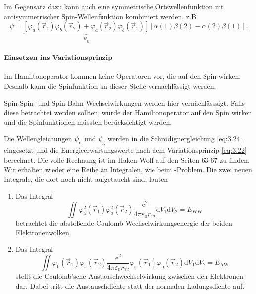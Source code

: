 	Im Gegensatz dazu kann auch eine symmetrische Ortswellenfunktion mt antisymmetrischer Spin-Wellenfunktion kombiniert werden, z.B.
	\setcounter{equation}{34}
	\begin{equation}
		\label{eq:3.35}
		\psi = \underbrace{\left[ \varphi_{a} \left( \vec{r}_{1} \right) \varphi_{b}\left( \vec{r}_{2} \right) + \varphi_{a}\left( \vec{r}_{2} \right) \varphi_{b}\left( \vec{r}_{1} \right)  \right]}_{ \psi_{\text{g}}} \left[ \alpha\left( 1 \right) \beta\left( 2 \right) - \alpha\left( 2 \right) \beta\left( 1 \right)  \right]. 
	\end{equation}
\paragraph{Einsetzen ins Variationsprinzip}
	Im Hamiltonoperator kommen keine Operatoren vor, die auf den Spin wirken. 
	Deshalb kann die Spinfunktion an dieser Stelle vernachlässigt werden.
	\begin{verbal}
		Spin-Spin- und Spin-Bahn-Wechselwirkungen werden hier vernächlässsigt.
		Falls diese betrachtet werden sollten, würde der Hamiltonoperator auf den Spin wirken und die Spinfunktionen müssten berücksichtigt werden.
	\end{verbal}
	Die Wellengleichungen $ \psi_{\text{u}}$ und $ \psi_{\text{g}}$ werden in die Schrödignergleichung \eqref{eq:3.24} eingesetzt und die Energieerwartungswerte nach dem Variationsprinzip \eqref{eq:3.22} berechnet.
	Die volle Rechnung ist im Haken-Wolf auf den Seiten 63-67 zu finden.\\

	Wir erhalten wieder eine Reihe an Integralen, wie beim -Problem. 
	Die zwei neuen Integrale, die dort noch nicht aufgetaucht sind, lauten
	\begin{enumerate}
		\item Das Integral $$
			\iint \varphi_\text{a}^2\left( \vec{r}_{1} \right) \varphi_\text{b}^{2} \left( \vec{r}_{2} \right) \frac{ \mathrm{e}^2}{4 \pi \varepsilon_0 r_{12}} \mathrm{d} V_1 \mathrm{d} V_2 = E_{\text{WW}}
		$$
		betrachtet die abstoßende Coulomb-Wechselwirkungsenergie der beiden Elektronenwolken.
	\item Das Integral
		$$
		\iint \varphi_\text{b} \left( \vec{r}_{1} \right) \varphi_\text{a} \left( \vec{r}_{2} \right) \frac{\mathrm{e}^2}{4 \pi \varepsilon_0 r_{12}} \varphi_\text{a} \left( \vec{r}_{1} \right) \varphi_\text{b}\left( \vec{r}_{2} \right) \mathrm{d} V_1 \mathrm{d} V_2 = E_{\text{AW}}
		$$ 
		stellt die Coulomb'sche Austauschwechselwirkung zwischen den Elektronen dar. 
		Dabei tritt die Austauschdichte statt der normalen Ladungsdichte auf.
	\end{enumerate}

